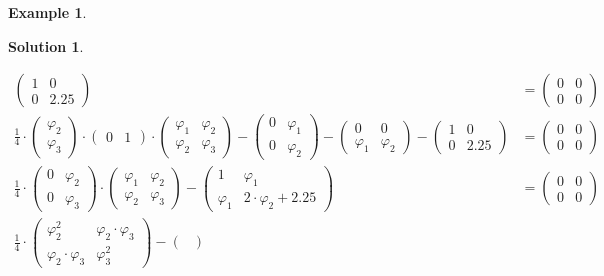 \documentclass[a4paper,12 pt]{article}
\numberwithin{equation}{section}
\theoremstyle{definition}
\newtheorem{bsp}{Example}
\theoremstyle{remark}
\theoremstyle{definition}
\newtheorem*{lsg}{Solution}
\theoremstyle{definition}
\theoremstyle{definition}
\theoremstyle{remark}
\begin{document}
\begin{bsp}
\begin{lsg}
\begin{enumerate}[(a)]
\begin{equation*}
\begin{split}
\begin{pmatrix}
1&0\\
0&2.25
\end{pmatrix}&=\begin{pmatrix} 0&0\\ 0&0 \end{pmatrix}\\
\frac{1}{4}\cdot \begin{pmatrix}
\varphi_2\\
\varphi_3
\end{pmatrix}\cdot \begin{pmatrix} 0&1\end{pmatrix}\cdot \begin{pmatrix}
\varphi_1 & \varphi_2\\
\varphi_2 & \varphi_3
\end{pmatrix}
- \begin{pmatrix}0&\varphi_1\\0&\varphi_2 \end{pmatrix} - 
\begin{pmatrix}
0&0\\
\varphi_1 & \varphi_2 
\end{pmatrix}-\begin{pmatrix}
1&0\\
0&2.25
\end{pmatrix}&=\begin{pmatrix} 0&0\\ 0&0 \end{pmatrix}\\
\frac{1}{4}\cdot \begin{pmatrix}
 0&\varphi_2\\
 0&\varphi_3
 \end{pmatrix}\cdot \begin{pmatrix}
\varphi_1 & \varphi_2\\
\varphi_2 & \varphi_3
\end{pmatrix}
 -\begin{pmatrix}
1&\varphi_1 \\
\varphi_1 & 2\cdot \varphi_2+2.25
\end{pmatrix}&=\begin{pmatrix} 0&0\\ 0&0 \end{pmatrix}\\
\frac{1}{4}\cdot
\begin{pmatrix}
\varphi_2^2&\varphi_2 \cdot \varphi_3\\
\varphi_2 \cdot \varphi_3 &\varphi_3^2
\end{pmatrix}-\begin{pmatrix}

\end{pmatrix}
\end{split}
\end{equation*}
\end{enumerate}
\end{lsg}
\end{bsp}
\end{document}
